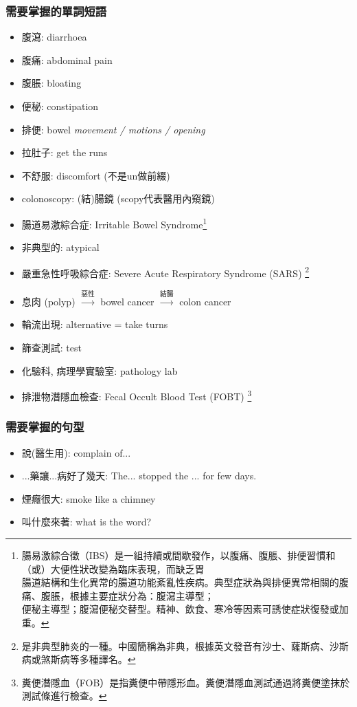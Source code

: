 \subsubsection*{需要掌握的單詞短語}
\begin{multicols}{2}
\begin{itemize}
  \itemsep0em
  \item 腹瀉: diarrhoea
  \item 腹痛: abdominal pain
  \item 腹脹: bloating
  \item 便秘: constipation
  \item 排便: bowel \textit{movement / motions / opening}
  \item 拉肚子: get the runs
  \item 不舒服: discomfort (不是un做前綴)
  \item colonoscopy: (結)腸鏡 (scopy代表醫用內窺鏡)
  \item 腸道易激綜合症: Irritable Bowel Syndrome\footnote{腸易激綜合徵（IBS）是一組持續或間歇發作，以腹痛、腹脹、排便習慣和（或）大便性狀改變為臨床表現，而缺乏胃\\腸道結構和生化異常的腸道功能紊亂性疾病。典型症狀為與排便異常相關的腹痛、腹脹，根據主要症狀分為：腹瀉主導型；\\便秘主導型；腹瀉便秘交替型。精神、飲食、寒冷等因素可誘使症狀復發或加重。}
  \item 非典型的: atypical
  \item 嚴重急性呼吸綜合症: Severe Acute Respiratory Syndrome (SARS) \footnote{是非典型肺炎的一種。中國簡稱為非典，根據英文發音有沙士、薩斯病、沙斯病或煞斯病等多種譯名。}
  \item 息肉 (polyp) $\xrightarrow{\text{惡性}}$ bowel cancer $\xrightarrow{\text{結腸}}$ colon cancer
  \item 輪流出現: alternative = take turns
  \item 篩查測試:  test
  \item 化驗科, 病理學實驗室: pathology lab
  \item 排泄物潛隱血檢查: Fecal Occult Blood Test (FOBT) \footnote{糞便潛隱血（FOB）是指糞便中帶隱形血。糞便潛隱血測試通過將糞便塗抹於測試條進行檢查。}
\end{itemize}
\end{multicols}

\subsubsection*{需要掌握的句型}
\begin{itemize}
  \item 說(醫生用): complain of...
  \item ...藥讓...病好了幾天: The... stopped the ... for few days.
  \item 煙癮很大: smoke like a chimney
  \item 叫什麼來著: what is the word?
\end{itemize}

